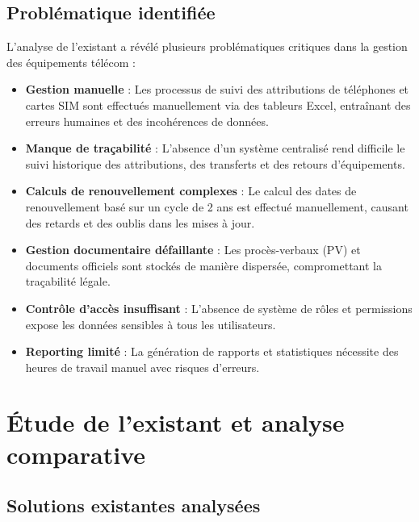 \documentclass[12pt,a4paper]{report}
\begin{document}
\subsection{Problématique identifiée}
L'analyse de l'existant a révélé plusieurs problématiques critiques dans la gestion des équipements télécom :

\begin{itemize}
\item \textbf{Gestion manuelle} : Les processus de suivi des attributions de téléphones et cartes SIM sont effectués manuellement via des tableurs Excel, entraînant des erreurs humaines et des incohérences de données.

\item \textbf{Manque de traçabilité} : L'absence d'un système centralisé rend difficile le suivi historique des attributions, des transferts et des retours d'équipements.

\item \textbf{Calculs de renouvellement complexes} : Le calcul des dates de renouvellement basé sur un cycle de 2 ans est effectué manuellement, causant des retards et des oublis dans les mises à jour.

\item \textbf{Gestion documentaire défaillante} : Les procès-verbaux (PV) et documents officiels sont stockés de manière dispersée, compromettant la traçabilité légale.

\item \textbf{Contrôle d'accès insuffisant} : L'absence de système de rôles et permissions expose les données sensibles à tous les utilisateurs.

\item \textbf{Reporting limité} : La génération de rapports et statistiques nécessite des heures de travail manuel avec risques d'erreurs.
\end{itemize}

\section{Étude de l'existant et analyse comparative}

\subsection{Solutions existantes analysées}
\end{document}
